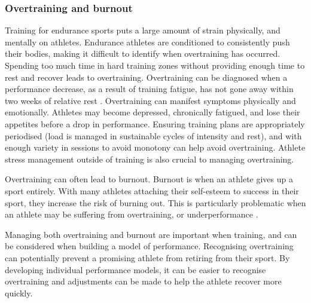 \subsubsection{Overtraining and burnout}
Training for endurance sports puts a large amount of strain physically, and mentally on athletes. Endurance athletes are conditioned to consistently push their bodies, making it difficult to identify when overtraining has occurred. Spending too much time in hard training zones without providing enough time to rest and recover leads to overtraining. Overtraining can be diagnosed when a performance decrease, as a result of training fatigue, has not gone away within two weeks of relative rest \cite{kayser2004chronic}. Overtraining can manifest symptoms physically and emotionally. Athletes may become depressed, chronically fatigued, and lose their appetites before a drop in performance. Ensuring training plans are appropriately periodised (load is managed in sustainable cycles of intensity and rest), and with enough variety in sessions to avoid monotony can help avoid overtraining. Athlete stress management outside of training is also crucial to managing overtraining.

Overtraining can often lead to burnout. Burnout is when an athlete gives up a sport entirely. With many athletes attaching their self-esteem to success in their sport, they increase the risk of burning out. This is particularly problematic when an athlete may be suffering from overtraining, or underperformance \cite{gustafsson2007burnout}.

Managing both overtraining and burnout are important when training, and can be considered when building a model of performance. Recognising overtraining can potentially prevent a promising athlete from retiring from their sport. By developing individual performance models, it can be easier to recognise overtraining and adjustments can be made to help the athlete recover more quickly.

